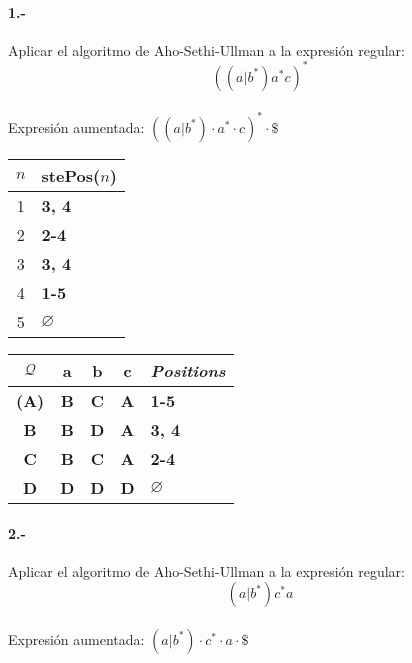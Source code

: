\documentclass[11pt,a4paper,table,answers]{exam} %
\newcommand{\h}[1]{\ifprintanswers\textcolor{azul}{\bf#1}\else{\phantom{\bf#1}}\fi}
\newlength{\graphicheigth}
\newcommand{\myincludegraphicssol}[1]{%
    \sbox{\graphicbox}{%
        \begin{adjustbox}{max size={\textwidth}{\textheight}}
            \texttt{[image: \#1]}
        \end{adjustbox}
    }
    \settoheight{\graphicheigth}{\usebox{\graphicbox}}
    \addtolength{\graphicheigth}{4ex} %
    \ifprintanswers
        \begin{center}
            \usebox{\graphicbox}
        \end{center} 
    \else
        \makeemptybox{\graphicheigth}
    \fi
}
\begin{document}
\paragraph{1.-}\label{p1}
Aplicar el algoritmo de Aho-Sethi-Ullman a la expresión regular:
\[
    ((a|b^*)a^*c)^*
\]
~\\
Expresión aumentada: \h{$ ((a|b^*)\cdot a^*\cdot c)^*\cdot \$  $} \\

\myincludegraphicssol{}
\begin{tabular} {c@{\hspace{4mm}}l}
\toprule %
$n$ & stePos($n$) \\
\midrule %
1 & \h{3, 4} \\ 
2 & \h{2-4} \\ 
3 & \h{3, 4} \\ 
4 & \h{1-5} \\ 
5 & \h{$\varnothing$} \\ 
\bottomrule %
\end{tabular}
\quad
{}
\begin{tabular} {c@{\hspace{4mm}}ccc@{\hspace{4mm}}l}
\toprule %
$\mathcal{Q}$ & a & b & c & \emph{Positions}\\ 
\midrule %
\h{(A)} & \h{B} & \h{C} & \h{A} & \h{1-5}\\ 
\h{B} & \h{B} & \h{D} & \h{A} & \h{3, 4}\\ 
\h{C} & \h{B} & \h{C} & \h{A} & \h{2-4}\\ 
\h{D} & \h{D} & \h{D} & \h{D} & \h{$\varnothing$}\\ 
\bottomrule %
\end{tabular}

\paragraph{2.-}\label{p2}
Aplicar el algoritmo de Aho-Sethi-Ullman a la expresión regular:
\[
    (a|b^*)c^*a
\]
~\\
Expresión aumentada: \h{$ (a|b^*)\cdot c^*\cdot a\cdot \$  $} \\
\end{document}
